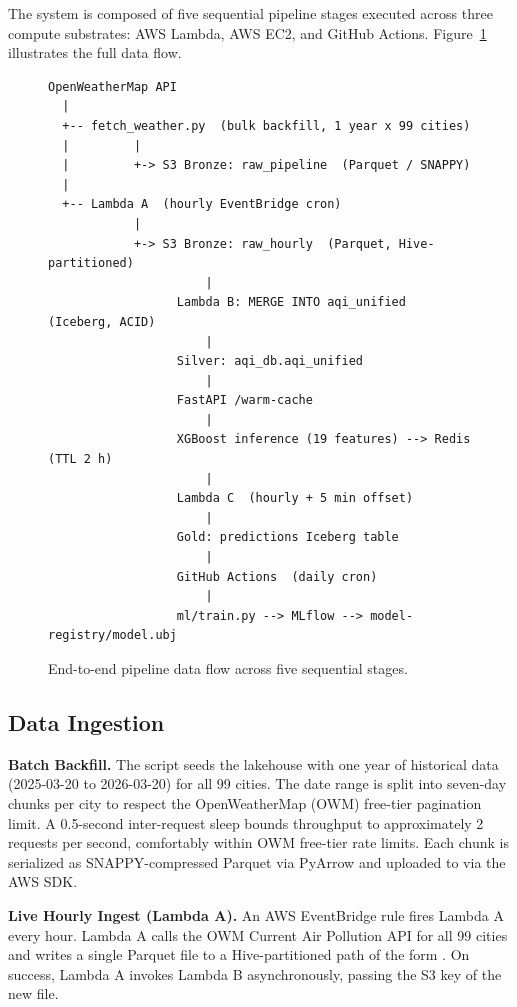 \documentclass[sigconf, nonacm]{acmart}
\begin{document}
The system is composed of five sequential pipeline stages
executed across three compute substrates: AWS Lambda, AWS
EC2, and GitHub Actions.
Figure~\ref{fig:pipeline} illustrates the full data flow.

\begin{figure}[t]
\small
\begin{verbatim}
OpenWeatherMap API
  |
  +-- fetch_weather.py  (bulk backfill, 1 year x 99 cities)
  |         |
  |         +-> S3 Bronze: raw_pipeline  (Parquet / SNAPPY)
  |
  +-- Lambda A  (hourly EventBridge cron)
            |
            +-> S3 Bronze: raw_hourly  (Parquet, Hive-partitioned)
                      |
                  Lambda B: MERGE INTO aqi_unified  (Iceberg, ACID)
                      |
                  Silver: aqi_db.aqi_unified
                      |
                  FastAPI /warm-cache
                      |
                  XGBoost inference (19 features) --> Redis  (TTL 2 h)
                      |
                  Lambda C  (hourly + 5 min offset)
                      |
                  Gold: predictions Iceberg table
                      |
                  GitHub Actions  (daily cron)
                      |
                  ml/train.py --> MLflow --> model-registry/model.ubj
\end{verbatim}
\caption{End-to-end pipeline data flow across five sequential stages.}
\label{fig:pipeline}
\end{figure}

\subsection{Data Ingestion}

\textbf{Batch Backfill.}
The script  seeds the
lakehouse with one year of historical data
(2025-03-20 to 2026-03-20) for all 99 cities.  The date
range is split into seven-day chunks per city to respect
the OpenWeatherMap (OWM) free-tier pagination limit.  A
0.5-second inter-request sleep bounds throughput to
approximately 2 requests per second, comfortably within
OWM free-tier rate limits.  Each chunk is serialized as
SNAPPY-compressed Parquet via PyArrow and uploaded to
 via the AWS SDK.

\textbf{Live Hourly Ingest (Lambda A).}
An AWS EventBridge rule fires Lambda A every hour.
Lambda A calls the OWM Current Air Pollution API for all
99 cities and writes a single Parquet file to a
Hive-partitioned path of the form
.
On success, Lambda A invokes Lambda B asynchronously,
passing the S3 key of the new file.
\end{document}
